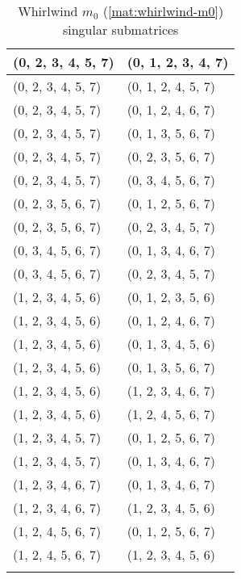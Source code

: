 \begin{footnotesize}
\begin{longtable}[c]{|l|l|}
(0, 2, 3, 4, 5, 7)
&(0, 1, 2, 3, 4, 7)
\\ \hline
(0, 2, 3, 4, 5, 7)
&(0, 1, 2, 4, 5, 7)
\\ \hline
(0, 2, 3, 4, 5, 7)
&(0, 1, 2, 4, 6, 7)
\\ \hline
(0, 2, 3, 4, 5, 7)
&(0, 1, 3, 5, 6, 7)
\\ \hline
(0, 2, 3, 4, 5, 7)
&(0, 2, 3, 5, 6, 7)
\\ \hline
(0, 2, 3, 4, 5, 7)
&(0, 3, 4, 5, 6, 7)
\\ \hline
(0, 2, 3, 5, 6, 7)
&(0, 1, 2, 5, 6, 7)
\\ \hline
(0, 2, 3, 5, 6, 7)
&(0, 2, 3, 4, 5, 7)
\\ \hline
(0, 3, 4, 5, 6, 7)
&(0, 1, 3, 4, 6, 7)
\\ \hline
(0, 3, 4, 5, 6, 7)
&(0, 2, 3, 4, 5, 7)
\\ \hline
(1, 2, 3, 4, 5, 6)
&(0, 1, 2, 3, 5, 6)
\\ \hline
(1, 2, 3, 4, 5, 6)
&(0, 1, 2, 4, 6, 7)
\\ \hline
(1, 2, 3, 4, 5, 6)
&(0, 1, 3, 4, 5, 6)
\\ \hline
(1, 2, 3, 4, 5, 6)
&(0, 1, 3, 5, 6, 7)
\\ \hline
(1, 2, 3, 4, 5, 6)
&(1, 2, 3, 4, 6, 7)
\\ \hline
(1, 2, 3, 4, 5, 6)
&(1, 2, 4, 5, 6, 7)
\\ \hline
(1, 2, 3, 4, 5, 7)
&(0, 1, 2, 5, 6, 7)
\\ \hline
(1, 2, 3, 4, 5, 7)
&(0, 1, 3, 4, 6, 7)
\\ \hline
(1, 2, 3, 4, 6, 7)
&(0, 1, 3, 4, 6, 7)
\\ \hline
(1, 2, 3, 4, 6, 7)
&(1, 2, 3, 4, 5, 6)
\\ \hline
(1, 2, 4, 5, 6, 7)
&(0, 1, 2, 5, 6, 7)
\\ \hline
(1, 2, 4, 5, 6, 7)
&(1, 2, 3, 4, 5, 6)
\\ \hline
\caption{Whirlwind $m_0$ (\ref{mat:whirlwind-m0}) singular submatrices}\label{tbl:m0-singular}
\end{longtable}
\end{footnotesize}
